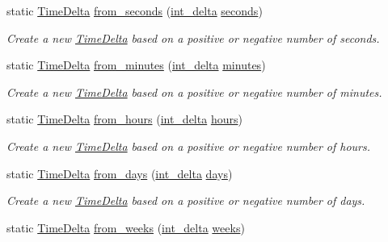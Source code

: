 \begin{DoxyCompactItemize}
static \hyperlink{structTimeDelta}{Time\-Delta} \hyperlink{structTimeDelta_aad4311d8580ade36d8c567576630c967}{from\-\_\-seconds} (\hyperlink{types_8h_a8a67cf99971c5cfeeaa2380ba84a4c92}{int\-\_\-delta} \hyperlink{structTimeDelta_aa1fe6d8a690ab04b561400c09db673ef}{seconds})
\begin{DoxyCompactList}\small\item\em Create a new \hyperlink{structTimeDelta}{Time\-Delta} based on a positive or negative number of seconds. \end{DoxyCompactList}\item 
static \hyperlink{structTimeDelta}{Time\-Delta} \hyperlink{structTimeDelta_a244bc3b143bfa760aa2b0cf350cf768c}{from\-\_\-minutes} (\hyperlink{types_8h_a8a67cf99971c5cfeeaa2380ba84a4c92}{int\-\_\-delta} \hyperlink{structTimeDelta_a2856a4e761fc83822cc6987655035e76}{minutes})
\begin{DoxyCompactList}\small\item\em Create a new \hyperlink{structTimeDelta}{Time\-Delta} based on a positive or negative number of minutes. \end{DoxyCompactList}\item 
static \hyperlink{structTimeDelta}{Time\-Delta} \hyperlink{structTimeDelta_a912f6ceafac4b9252a1a5d76033754ea}{from\-\_\-hours} (\hyperlink{types_8h_a8a67cf99971c5cfeeaa2380ba84a4c92}{int\-\_\-delta} \hyperlink{structTimeDelta_a5135596cbf7f7ef40001e25c5aa880b3}{hours})
\begin{DoxyCompactList}\small\item\em Create a new \hyperlink{structTimeDelta}{Time\-Delta} based on a positive or negative number of hours. \end{DoxyCompactList}\item 
static \hyperlink{structTimeDelta}{Time\-Delta} \hyperlink{structTimeDelta_a9bb1a85b6f27ad8488ae06e238d5808e}{from\-\_\-days} (\hyperlink{types_8h_a8a67cf99971c5cfeeaa2380ba84a4c92}{int\-\_\-delta} \hyperlink{structTimeDelta_abad8a94a6c022af1a1871e452eca47ea}{days})
\begin{DoxyCompactList}\small\item\em Create a new \hyperlink{structTimeDelta}{Time\-Delta} based on a positive or negative number of days. \end{DoxyCompactList}\item 
static \hyperlink{structTimeDelta}{Time\-Delta} \hyperlink{structTimeDelta_ae0f0a41d899e62b9d17bc4542c443ec6}{from\-\_\-weeks} (\hyperlink{types_8h_a8a67cf99971c5cfeeaa2380ba84a4c92}{int\-\_\-delta} \hyperlink{structTimeDelta_a4e583a79abea664691df4680f4fd467d}{weeks})

\end{DoxyCompactItemize}
